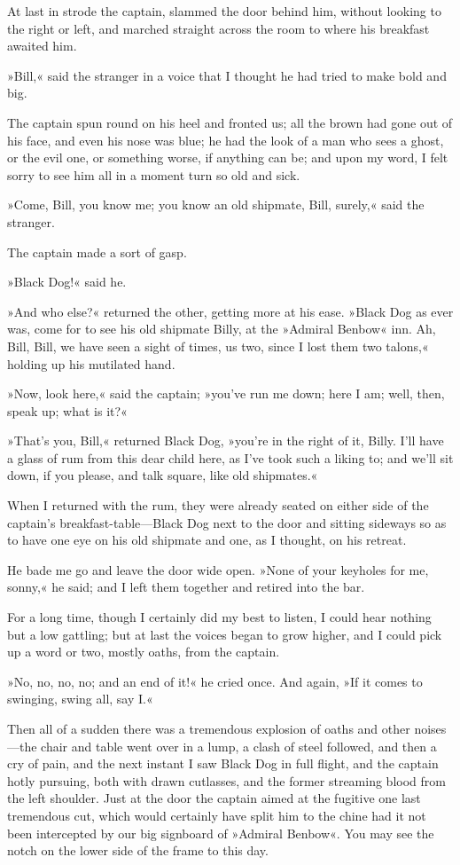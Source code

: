 At last in strode the captain, slammed the door behind him, without looking to the right or left, and marched straight across the room to where his breakfast awaited him.

»Bill,« said the stranger in a voice that I thought he had tried to make bold and big.

The captain spun round on his heel and fronted us; all the brown had gone out of his face, and even his nose was blue; he had the look of a man who sees a ghost, or the evil one, or something worse, if anything can be; and upon my word, I felt sorry to see him all in a moment turn so old and sick.

»Come, Bill, you know me; you know an old shipmate, Bill, surely,« said the stranger.

The captain made a sort of gasp.

»Black Dog!« said he.

»And who else?« returned the other, getting more at his ease. »Black Dog as ever was, come for to see his old shipmate Billy, at the »Admiral Benbow« inn. Ah, Bill, Bill, we have seen a sight of times, us two, since I lost them two talons,« holding up his mutilated hand.

»Now, look here,« said the captain; »you've run me down; here I am; well, then, speak up; what is it?«

»That's you, Bill,« returned Black Dog, »you're in the right of it, Billy. I'll have a glass of rum from this dear child here, as I've took such a liking to; and we'll sit down, if you please, and talk square, like old shipmates.«

When I returned with the rum, they were already seated on either side of the captain's breakfast-table—Black Dog next to the door and sitting sideways so as to have one eye on his old shipmate and one, as I thought, on his retreat.

He bade me go and leave the door wide open. »None of your keyholes for me, sonny,« he said; and I left them together and retired into the bar.

For a long time, though I certainly did my best to listen, I could hear nothing but a low gattling; but at last the voices began to grow higher, and I could pick up a word or two, mostly oaths, from the captain.

»No, no, no, no; and an end of it!« he cried once. And again, »If it comes to swinging, swing all, say I.«

 

Then all of a sudden there was a tremendous explosion of oaths and other noises—the chair and table went over in a lump, a clash of steel followed, and then a cry of pain, and the next instant I saw Black Dog in full flight, and the captain hotly pursuing, both with drawn cutlasses, and the former streaming blood from the left shoulder. Just at the door the captain aimed at the fugitive one last tremendous cut, which would certainly have split him to the chine had it not been intercepted by our big signboard of »Admiral Benbow«. You may see the notch on the lower side of the frame to this day.


